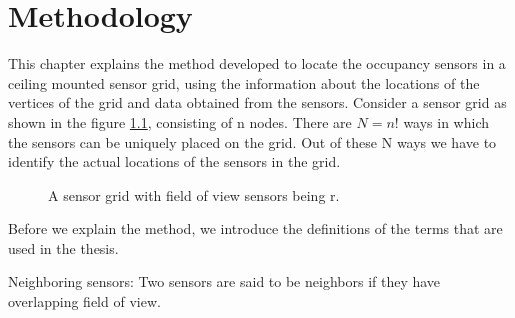 \chapter{Methodology}

This chapter explains the method developed to locate the occupancy sensors in a ceiling mounted sensor grid, using the information about the locations of the vertices of the grid and data obtained from the sensors.
Consider a sensor grid as shown in the figure \ref{fig:Grid}, consisting of n nodes. There are $N= n!$ ways in which the sensors can be uniquely placed on the grid. 
Out of these N ways we have to identify the actual locations of the sensors in the grid.
\begin{figure}[!ht]
\centering
\caption{A sensor grid with field of view sensors being r.}
\label{fig:Grid}
\end{figure}
Before we explain the method, we introduce the definitions of the terms that are used in the thesis.
\begin{definition}{Neighboring sensors:}
 Two sensors are said to be neighbors if they have overlapping field of view.
\label{def:ns}
\end{definition}
